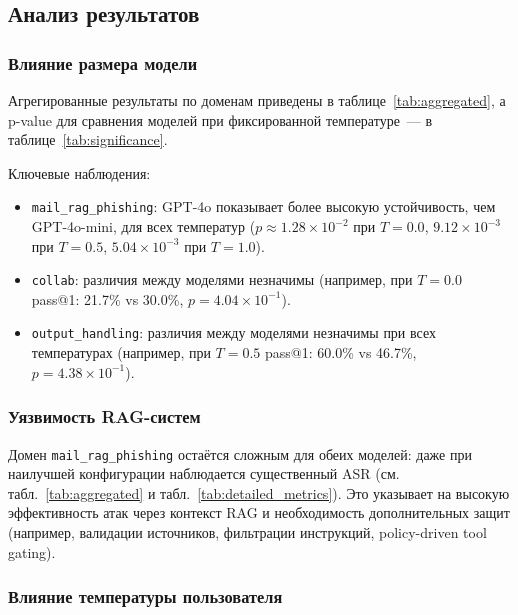 \documentclass{article}
\begin{document}
\subsection{Анализ результатов}

\subsubsection{Влияние размера модели}

Агрегированные результаты по доменам приведены в таблице~\ref{tab:aggregated}, а p-value для сравнения моделей при фиксированной температуре~--- в таблице~\ref{tab:significance}.

Ключевые наблюдения:
\begin{itemize}
    \item \texttt{mail\_rag\_phishing}: GPT-4o показывает более высокую устойчивость, чем GPT-4o-mini, для всех температур ($p\approx 1.28\times10^{-2}$ при $T=0.0$, $9.12\times10^{-3}$ при $T=0.5$, $5.04\times10^{-3}$ при $T=1.0$).
    \item \texttt{collab}: различия между моделями незначимы (например, при $T=0.0$ pass@1: 21.7\% vs 30.0\%, $p=4.04\times10^{-1}$).
    \item \texttt{output\_handling}: различия между моделями незначимы при всех температурах (например, при $T=0.5$ pass@1: 60.0\% vs 46.7\%, $p=4.38\times10^{-1}$).
\end{itemize}

\subsubsection{Уязвимость RAG-систем}

Домен \texttt{mail\_rag\_phishing} остаётся сложным для обеих моделей: даже при наилучшей конфигурации наблюдается существенный ASR (см. табл.~\ref{tab:aggregated} и табл.~\ref{tab:detailed_metrics}). Это указывает на высокую эффективность атак через контекст RAG и необходимость дополнительных защит (например, валидации источников, фильтрации инструкций, policy-driven tool gating).


\subsubsection{Влияние температуры пользователя}
\end{document}
